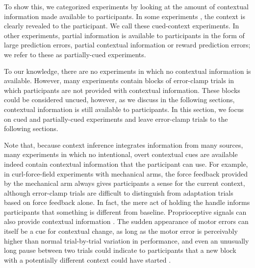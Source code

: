 \documentclass[a4paper,doc,floatsintext,natbib]{apa6}
\begin{document}
To show this, we categorized experiments by looking at the amount of contextual information made available to participants. In some experiments \citep[e.g.][]{Kim_Neural_2015,Lee_Dual_2009}, the context is clearly revealed to the participant. We call these cued-context experiments. In other experiments, partial information is available to participants \citep[e.g.][]{Davidson_Scaling_2004,Zarahn_Explaining_2008} in the form of large prediction errors, partial contextual information or reward prediction errors; we refer to these as partially-cued experiments.

To our knowledge, there are no experiments in which no contextual information is available. However, many experiments \citep[e.g.][]{Huang_Persistence_2009,Brennan_Decay_2015,Smith_Interacting_2006} contain blocks of error-clamp trials in which participants are not provided with contextual information. These blocks could be considered uncued, however, as we discuss in the following sections, contextual information is still available to participants. In this section, we focus on cued and partially-cued experiments and leave error-clamp trials to the following sections.

Note that, because context inference integrates information from many sources, many experiments in which no intentional, overt contextual cues are available indeed contain contextual information that the participant can use. For example, in curl-force-field experiments with mechanical arms, the force feedback provided by the mechanical arm always gives participants a sense for the current context, although error-clamp trials are difficult to distinguish from adaptation trials based on force feedback alone. In fact, the mere act of holding the handle informs participants that something is different from baseline. Proprioceptive signals can also provide contextual information \cite{Dizio_Motor_1995,Shadmehr_Adaptive_1994}. The sudden appearance of motor errors can itself be a cue for contextual change, as long as the motor error is perceivably higher than normal trial-by-trial variation in performance, and even an unusually long pause between two trials could indicate to participants that a new block with a potentially different context could have started \cite[e.g.][]{Ethier_Spontaneous_2008}.
\end{document}
